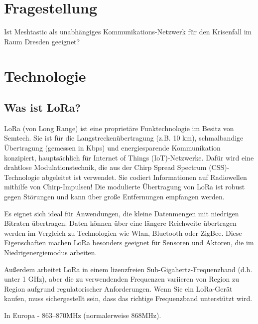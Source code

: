 \documentclass[12pt,a4paper]{article}
\begin{document}
\section{Fragestellung}

Ist Meshtastic als unabhängiges Kommunikations-Netzwerk für den Krisenfall im Raum Dresden geeignet?

\section{Technologie}
\subsection{Was ist LoRa?}

LoRa (von Long Range) ist eine proprietäre Funktechnologie im Besitz von Semtech. Sie ist für die Langstreckenübertragung (z.B. 10 km), schmalbandige Übertragung (gemessen in Kbps) und energiesparende Kommunikation konzipiert, hauptsächlich für Internet of Things (IoT)-Netzwerke. Dafür wird eine drahtlose Modulationstechnik, die aus der Chirp Spread Spectrum (CSS)-Technologie abgeleitet ist verwendet. Sie codiert Informationen auf Radiowellen mithilfe von Chirp-Impulsen! Die modulierte Übertragung von LoRa ist robust gegen Störungen und kann über große Entfernungen empfangen werden.

Es eignet sich ideal für Anwendungen, die kleine Datenmengen mit niedrigen Bitraten übertragen. Daten können über eine längere Reichweite übertragen werden im Vergleich zu Technologien wie Wlan, Bluetooth oder ZigBee. Diese Eigenschaften machen LoRa besonders geeignet für Sensoren und Aktoren, die im Niedrigenergiemodus arbeiten.

Außerdem arbeitet LoRa in einem lizenzfreien Sub-Gigahertz-Frequenzband (d.h. unter 1 GHz), aber die zu verwendenden Frequenzen variieren von Region zu Region aufgrund regulatorischer Anforderungen. Wenn Sie ein LoRa-Gerät kaufen, muss sichergestellt sein, dass das richtige Frequenzband unterstützt wird.

In Europa - 863–870MHz (normalerweise 868MHz).
\end{document}
